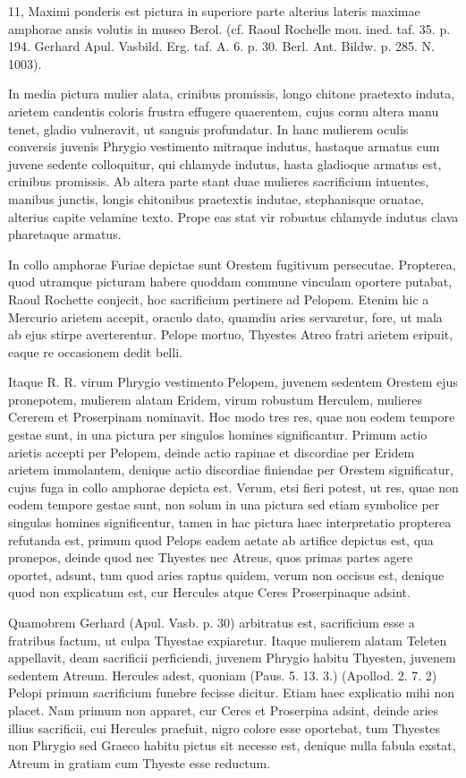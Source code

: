 \documentclass[a4paper, 11pt, oneside, polutonikogreek, german]{article}
\begin{document}
11, Maximi ponderis est pictura in superiore parte alterius lateris maximae amphorae ansis volutis in museo Berol. (cf. Raoul Rochelle mou. ined. taf. 35. p. 194. Gerhard Apul. Vasbild. Erg. taf. A. 6. p. 30. Berl. Ant. Bildw. p. 285. N. 1003).

In media pictura mulier alata, crinibus promissis, longo chitone praetexto induta, arietem candentis coloris frustra effugere quaerentem, cujus cornu altera manu tenet, gladio vulneravit, ut sanguis profundatur. In hanc mulierem oculis conversis juvenis Phrygio vestimento mitraque indutus, hastaque armatus cum juvene sedente colloquitur, qui chlamyde indutus, hasta gladioque armatus est, crinibus promissis. Ab altera parte stant duae mulieres sacrificium intuentes, manibus junctis, longis chitonibus praetextis indutae, stephanisque ornatae, alterius capite velamine texto. Prope eas stat vir robustus chlamyde indutus clava pharetaque armatus.

In collo amphorae Furiae depictae sunt Orestem fugitivum persecutae. Propterea, quod utramque picturam habere quoddam commune vinculam oportere putabat, Raoul Rochette conjecit, hoc sacrificium pertinere ad Pelopem. Etenim hic a Mercurio arietem accepit, oraculo dato, quamdiu aries servaretur, fore, ut mala ab ejus stirpe averterentur. Pelope mortuo, Thyestes Atreo fratri arietem eripuit, eaque re occasionem dedit belli.

Itaque R. R. virum Phrygio vestimento Pelopem, juvenem sedentem Orestem ejus pronepotem, mulierem alatam Eridem, virum robustum Herculem, mulieres Cererem et Proserpinam nominavit. Hoc modo tres res, quae non eodem tempore gestae sunt, in una pictura per singulos homines significantur. Primum actio arietis accepti per Pelopem, deinde actio rapinae et discordiae per Eridem arietem immolantem, denique actio discordiae finiendae per Orestem significatur, cujus fuga in collo amphorae depicta est. Verum, etsi fieri potest, ut res, quae non eodem tempore gestae sunt, non solum in una pictura sed etiam symbolice per singulas homines significentur, tamen in hac pictura haec interpretatio propterea refutanda est, primum quod Pelops eadem aetate ab artifice depictus est, qua pronepos, deinde quod nec Thyestes nec Atreus, quos primas partes agere oportet, adsunt, tum quod aries raptus quidem, verum non occisus est, denique quod non explicatum est, cur Hercules atque Ceres Proserpinaque adsint.

Quamobrem Gerhard (Apul. Vasb. p. 30) arbitratus est, sacrificium esse a fratribus factum, ut culpa Thyestae expiaretur. Itaque mulierem alatam Teleten appellavit, deam sacrificii perficiendi, juvenem Phrygio habitu Thyesten, juvenem sedentem Atreum. Hercules adest, quoniam (Paus. 5. 13. 3.) (Apollod. 2. 7. 2) Pelopi primum sacrificium funebre fecisse dicitur. Etiam haec explicatio mihi non placet. Nam primum non apparet, cur Ceres et Proserpina adsint, deinde aries illius sacrificii, cui Hercules praefuit, nigro colore esse oportebat, tum Thyestes non Phrygio sed Graeco habitu pictus sit necesse est, denique nulla fabula exstat, Atreum in gratiam cum Thyeste esse reductum.
\end{document}
